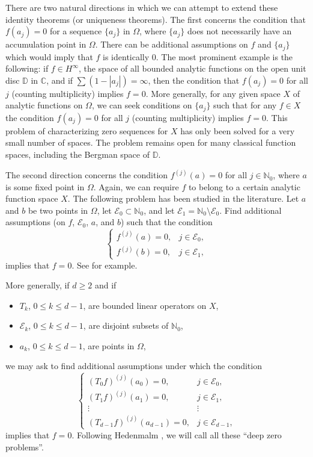 \documentclass[reqno,11pt]{amsart}
\newcommand{\C}{\mathbb C}
\newcommand{\D}{\mathbb D}
\newcommand{\E}{\mathcal E}
\newcommand{\N}{\mathbb N}
\begin{document}
There are two natural directions in which we can attempt to extend these identity 
theorems (or uniqueness theorems). The first concerns the condition that 
$f(a_j)=0$ for a sequence $\{a_j\}$ in $\Omega$, where $\{a_j\}$ does not 
necessarily have an accumulation point in $\Omega$. There can be additional 
assumptions on $f$ and $\{a_j\}$ which would imply that $f$ is identically $0$. 
The most prominent example is the following: if $f\in H^\infty$, the space of all 
bounded analytic functions on the open unit disc $\D$ in $\C$, and if 
$\sum(1-|a_j|)=\infty$, then the condition that $f(a_j)=0$ for all $j$ (counting
multiplicity) implies $f=0$. More generally, for any given space $X$ of analytic 
functions on $\Omega$, we can seek conditions on $\{a_j\}$ such that for any 
$f\in X$ the condition $f(a_j)=0$ for all $j$ (counting multiplicity) implies $f=0$. 
This problem of characterizing zero sequences for $X$ has only been solved for 
a very small number of spaces. The problem remains open for many classical 
function spaces, including the Bergman space of $\D$. 

The second direction concerns the condition $f^{(j)}(a)=0$  for all $j\in\N_0$, 
where $a$ is some fixed point in $\Omega$. Again, we can require $f$ 
to belong to a certain analytic function space $X$. The following problem has 
been studied in the literature. Let $a$ and $b$ be two points in 
$\Omega$, let $\E_0\subset\N_0$, and let $\E_1=\N_0\setminus\E_0$. Find 
additional assumptions (on $f$, $\E_0$, $a$, and $b$) such that the condition
$$\begin{cases} f^{(j)}(a)=0, &j\in \E_0,\\ f^{(j)}(b)=0, &j\in \E_1,\end{cases}$$
implies that $f=0$. See \cite{Abel1839, MAE1954, AI1947,JAK1968,JMW1964} 
for example.

More generally, if $d\ge2$ and if
\begin{itemize}
\item[(i)] $T_k$, $0\le k\le d-1$, are bounded linear operators on $X$, 
\item[(ii)] $\E_k$, $0\le k\le d-1$, are disjoint subsets of $\N_0$,
\item[(iii)] $a_k$, $0\le k\le d-1$, are points in $\Omega$,
\end{itemize}
we may ask to find additional assumptions under which the condition
$$\begin{cases}(T_0f)^{(j)}(a_0)=0,&j\in \E_0,\\
(T_1f)^{(j)}(a_1)=0,&j\in \E_1,\\
\vdots &\vdots\\
(T_{d-1}f)^{(j)}(a_{d-1})=0,&j\in \E_{d-1},\end{cases}$$
implies that $f=0$. Following Hedenmalm \cite{Hed2025}, we will call all 
these ``deep zero problems''. 
\end{document}
